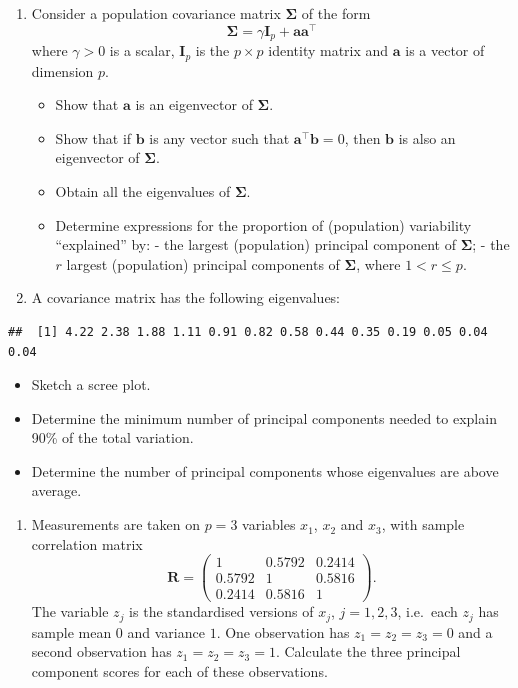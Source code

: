 \documentclass[]{book}
\providecommand{\tightlist}{%
  \setlength{\itemsep}{0pt}\setlength{\parskip}{0pt}}
\theoremstyle{definition}
\theoremstyle{definition}
\theoremstyle{definition}
\theoremstyle{remark}
\begin{document}
\begin{enumerate}
\def\labelenumi{\arabic{enumi}.}
\setcounter{enumi}{1}
\tightlist
\item
  Consider a population covariance matrix \(\boldsymbol{\Sigma}\) of the form
  \[\boldsymbol{\Sigma}=\gamma \mathbf I_p + \mathbf a\mathbf a^\top\]
  where \(\gamma>0\) is a scalar, \(\mathbf I_p\) is the \(p \times p\) identity matrix and \(\mathbf a\) is a vector of dimension \(p\).

  \begin{itemize}
  \tightlist
  \item
    Show that \(\mathbf a\) is an eigenvector of \(\boldsymbol{\Sigma}\).
  \item
    Show that if \(\mathbf b\) is any vector such that \(\mathbf a^\top \mathbf b=0\), then \(\mathbf b\) is also an eigenvector of \(\boldsymbol{\Sigma}\).
  \item
    Obtain all the eigenvalues of \(\boldsymbol{\Sigma}\).
  \item
    Determine expressions for the proportion of (population) variability ``explained'' by:
    - the largest (population) principal component of \(\boldsymbol{\Sigma}\);
    - the \(r\) largest (population) principal components of \(\boldsymbol{\Sigma}\), where \(1 < r \leq p\).
  \end{itemize}
\item
  A covariance matrix has the following eigenvalues:
\end{enumerate}

\begin{verbatim}
##  [1] 4.22 2.38 1.88 1.11 0.91 0.82 0.58 0.44 0.35 0.19 0.05 0.04 0.04
\end{verbatim}

\begin{itemize}
\tightlist
\item
  Sketch a scree plot.
\item
  Determine the minimum number of principal components needed to explain 90\% of the total variation.
\item
  Determine the number of principal components whose eigenvalues are above average.
\end{itemize}

\begin{enumerate}
\def\labelenumi{\arabic{enumi}.}
\setcounter{enumi}{3}
\tightlist
\item
  Measurements are taken on \(p=3\) variables \(x_1\), \(x_2\) and \(x_3\), with sample correlation matrix
  \[
   \mathbf R= \begin{pmatrix} 1 & 0.5792 & 0.2414 \\ 0.5792 & 1 & 0.5816 \\ 0.2414 & 0.5816 & 1 \end{pmatrix}.
  \]
  The variable \(z_j\) is the standardised versions of \(x_j\), \(j=1,2,3\), i.e.~each \(z_j\) has sample mean \(0\) and variance \(1\).
  One observation has \(z_1 = z_2 = z_3 = 0\) and a second observation has \(z_1 = z_2 = z_3 =1\). Calculate the three
  principal component scores for
  each of these observations.
\end{enumerate}


\end{document}

